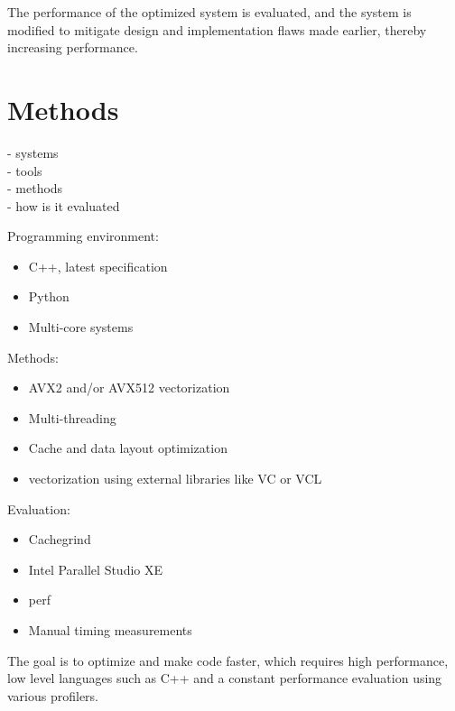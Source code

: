 \documentclass[12pt]{article}
\begin{document}
	The performance of the optimized system is evaluated, and the system is modified to mitigate design and implementation flaws made earlier, thereby increasing performance.
	
	

	\newpage
	\section{Methods}
	
	\color{red}
	- systems \\
	- tools \\
	- methods \\
	- how is it evaluated \\
	\color{black}
	
	Programming environment:
	\begin{itemize}
		\item C++, latest specification
		\item Python
		\item Multi-core systems
	\end{itemize}

	Methods:
	\begin{itemize}
		\item AVX2 and/or AVX512 vectorization
		\item Multi-threading
		\item Cache and data layout optimization
                \item vectorization using external libraries like VC or VCL
	\end{itemize}

	Evaluation:
	\begin{itemize}
		\item Cachegrind
		\item Intel Parallel Studio XE
                \item perf
		\item Manual timing measurements
	\end{itemize}

	The goal is to optimize and make code faster, which requires high performance, low level languages such as C++ and a constant performance evaluation using various profilers.



	\newpage
\end{document}
